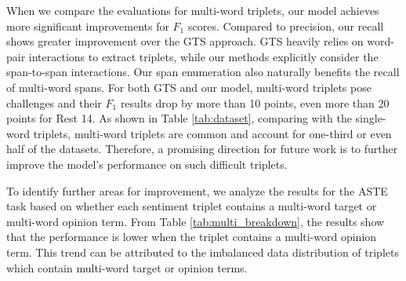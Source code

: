 \documentclass[11pt,a4paper]{article}
\begin{document}
When we compare the evaluations for multi-word triplets,
our model achieves more significant improvements for $F_1$ scores. Compared to precision, our recall shows greater improvement over the GTS approach.
GTS heavily relies on word-pair interactions to extract triplets,
while our methods explicitly consider the span-to-span interactions. 
Our span enumeration also 
naturally benefits the recall of multi-word spans. 
For both GTS and our model, multi-word triplets pose  challenges and their $F_1$ results drop by more than 10 points, even more than 20 points for Rest 14. 
As shown in Table \ref{tab:dataset}, comparing with the single-word triplets, multi-word triplets are common and account for one-third or even half of the datasets. 
Therefore, a promising direction for future work is to further improve the model's performance on such difficult triplets. 

To identify further areas for improvement,
we analyze the results for the ASTE task based on whether each sentiment triplet contains a multi-word target or multi-word opinion term.
From Table \ref{tab:multi_breakdown}, the results show that the performance is lower when the triplet contains a multi-word opinion term.
This trend can be attributed to the imbalanced data distribution of triplets which contain multi-word target or opinion terms.
\end{document}
